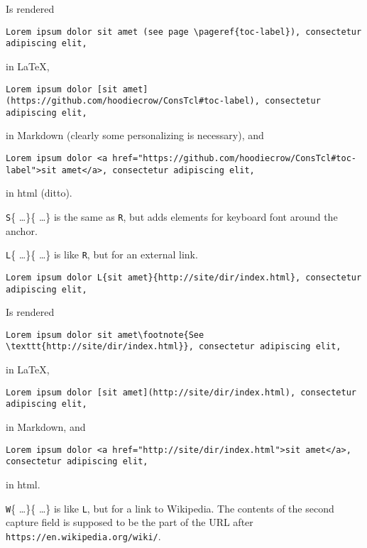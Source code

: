 Is rendered

\begin{verbatim}
Lorem ipsum dolor sit amet (see page \pageref{toc-label}), consectetur adipiscing elit,
\end{verbatim}

in \LaTeX{},

\begin{verbatim}
Lorem ipsum dolor [sit amet](https://github.com/hoodiecrow/ConsTcl#toc-label), consectetur adipiscing elit,
\end{verbatim}

in Markdown (clearly some personalizing is necessary), and

\begin{verbatim}
Lorem ipsum dolor <a href="https://github.com/hoodiecrow/ConsTcl#toc-label">sit amet</a>, consectetur adipiscing elit,
\end{verbatim}

in html (ditto).


\texttt{S}\{ \ldots  \}\{ \ldots  \} is the same as \texttt{R}, but adds elements for keyboard font around the anchor.


\texttt{L}\{ \ldots  \}\{ \ldots  \} is like \texttt{R}, but for an external link.

\begin{verbatim}
Lorem ipsum dolor L{sit amet}{http://site/dir/index.html}, consectetur adipiscing elit,
\end{verbatim}

Is rendered

\begin{verbatim}
Lorem ipsum dolor sit amet\footnote{See \texttt{http://site/dir/index.html}}, consectetur adipiscing elit,
\end{verbatim}

in \LaTeX{},

\begin{verbatim}
Lorem ipsum dolor [sit amet](http://site/dir/index.html), consectetur adipiscing elit,
\end{verbatim}

in Markdown, and

\begin{verbatim}
Lorem ipsum dolor <a href="http://site/dir/index.html">sit amet</a>, consectetur adipiscing elit,
\end{verbatim}

in html.


\texttt{W}\{ \ldots  \}\{ \ldots  \} is like \texttt{L}, but for a link to Wikipedia. The contents of the second capture field is supposed to be the part of the URL after \texttt{https://en.wikipedia.org/wiki/}.

